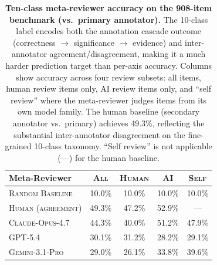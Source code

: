\begin{table}[t]
\centering
\fontsize{8}{10.5}\selectfont
\setlength{\tabcolsep}{5pt}
\begin{tabular}{l cccc}
\toprule
\textbf{Meta-Reviewer} & \textsc{All} & \textsc{Human} & \textsc{AI} & \textsc{Self} \\
\midrule
\textsc{Random Baseline} & 10.0\% & 10.0\% & 10.0\% & 10.0\% \\
\textsc{Human (agreement)} & 49.3\% & 47.2\% & 52.9\% & --- \\
\midrule
\textsc{Claude-Opus-4.7} & 44.3\% & 40.0\% & 51.2\% & 47.9\% \\
\textsc{GPT-5.4} & 30.1\% & 31.2\% & 28.2\% & 29.1\% \\
\textsc{Gemini-3.1-Pro} & 29.0\% & 26.1\% & 33.8\% & 39.6\% \\
\bottomrule
\end{tabular}
\caption{\textbf{Ten-class meta-reviewer accuracy on the 908-item benchmark (vs.\ primary annotator).}
The 10-class label encodes both the annotation cascade outcome (correctness $\to$ significance $\to$ evidence)
and inter-annotator agreement/disagreement, making it a much harder prediction target than per-axis accuracy.
Columns show accuracy across four review subsets: all items, human review items only, AI review items only,
and ``self review'' where the meta-reviewer judges items from its own model family.
The human baseline (secondary annotator vs.\ primary) achieves 49.3\%, reflecting the substantial
inter-annotator disagreement on the fine-grained 10-class taxonomy.
``Self review'' is not applicable (---) for the human baseline.}
\label{tab:metareview-uncertainty-accuracy}
\end{table}
